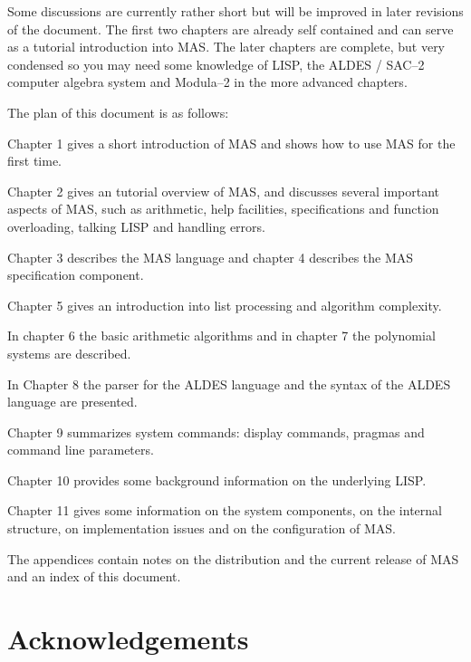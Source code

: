 Some discussions are currently rather short but 
will be improved in later revisions of the document.
The first two chapters are already self contained
and can serve as a tutorial introduction into MAS.
The later chapters are complete, but very condensed 
so you may need some knowledge of LISP, the ALDES / SAC--2
computer algebra system and Modula--2 
in the more advanced chapters.

The plan of this document is as follows:

Chapter 1 
gives a short introduction of MAS
and shows how to use MAS for the first time.

Chapter 2 
gives an tutorial overview of MAS,
and discusses several important aspects of MAS,
such as arithmetic, help facilities, 
specifications and function overloading,
talking LISP and handling errors.

Chapter 3 
describes the MAS language and chapter 4 describes the 
MAS specification component.

Chapter 5 
gives an introduction into list processing and 
algorithm complexity.

In chapter 6 the basic arithmetic algorithms 
and in chapter 7 the polynomial systems 
are described. 

In Chapter 8 
the parser for the ALDES language and the syntax of the 
ALDES language are presented. 

Chapter 9
summarizes system commands: display commands, pragmas
and command line parameters.

Chapter 10 
provides some background information 
on the underlying LISP.

Chapter 11 
gives some information on the system components, 
on the internal structure, on implementation issues 
and on the configuration of MAS.  

The appendices 
contain notes on the distribution and the 
current release of MAS and an index of this document.

\section*{Acknowledgements}

